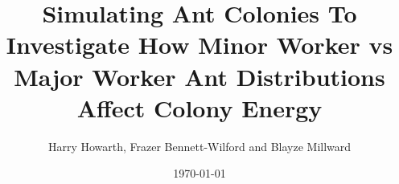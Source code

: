 \documentclass[11pt,oneside,titlepage]{article}
\title{Simulating Ant Colonies To Investigate How Minor Worker vs Major Worker Ant Distributions Affect Colony Energy}
\author{Harry Howarth, Frazer Bennett-Wilford and Blayze Millward}
\date{\today}
\begin{document}
  \maketitle
  
  \tableofcontents
  \newpage
  \listoffigures
  \listoftables
  
  
  
  
  
  
  
  
  
  
  \newpage
  
  

  \newpage
  \begin{appendix}
   
   \newpage
   
   \newpage
   
   \newpage
   
  \end{appendix}
  
\end{document}
